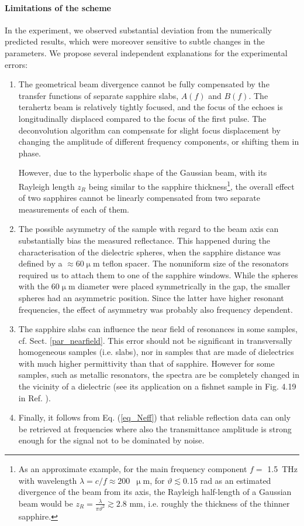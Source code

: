 \paragraph{Limitations of the scheme} %
In the experiment, we observed substantial deviation  %
from the numerically predicted results, which were moreover sensitive to subtle changes in the parameters. We propose  several independent explanations for the experimental errors:
\begin{enumerate}
\item{The geometrical beam divergence cannot be fully compensated by the transfer functions of separate sapphire slabs, $A(f)$ and $B(f)$. 
The terahertz beam is relatively tightly focused, and the focus of the echoes is longitudinally displaced compared to the focus of the first pulse. 
The deconvolution algorithm can compensate for slight focus displacement by changing the amplitude  of different frequency components, or shifting them in phase. 

However, due to the hyperbolic shape of the Gaussian beam, with its Rayleigh length $z_{R}$ being similar to the sapphire thickness\footnote{As an approximate example, for the main frequency component $f =$ 1.5~THz with wavelength $\lambda = c / f \approx 200$~$\upmu$m, for $\vartheta \lesssim 0.15$ rad as an estimated divergence of the beam from its axis, the Rayleigh half-length of a Gaussian beam would be $z_{R} = \frac{\lambda}{\pi \vartheta^{2}} \gtrsim 2.8$ mm, i.e. roughly the thickness of the thinner sapphire.}, the overall effect of two sapphires cannot be linearly compensated from two separate measurements of each of them.} 
 \item{The possible asymmetry of the sample with regard to the beam axis can substantially bias the measured reflectance. This happened during the characterisation of the dielectric spheres, when the sapphire distance was defined by a $\approx$60$\upmu$m teflon spacer. The nonuniform size of the resonators required us to attach them to one of the sapphire windows. While the spheres with the 60$\upmu$m diameter were placed symmetrically in the gap, the smaller spheres had an asymmetric position. Since the latter have higher resonant frequencies, the effect of asymmetry was probably also frequency dependent. } 
 \item{The sapphire slabs can influence the near field of resonances in some samples, cf. Sect. \ref{par_nearfield}. This error should not be significant in transversally homogeneous samples (i.e. slabs), nor in samples that are made of dielectrics with much higher permittivity than that of sapphire. However for some samples, such as metallic resonators, the spectra are be completely changed in the vicinity of a dielectric (see its application on a fishnet sample in Fig. 4.19 in Ref. \cite{yahiaoui2011phd}). }
 \item{Finally, it follows from Eq. (\ref{eq_Neff}) that reliable reflection data can only be retrieved at frequencies where also the transmittance amplitude is strong enough for the signal not to be dominated by noise. }
 \end{enumerate}
\label{srtm2}

